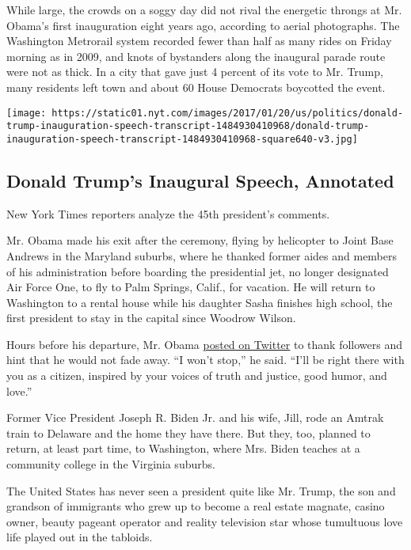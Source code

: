 While large, the crowds on a soggy day did not rival the energetic
throngs at Mr. Obama's first inauguration eight years ago, according to
aerial photographs. The Washington Metrorail system recorded fewer than
half as many rides on Friday morning as in 2009, and knots of bystanders
along the inaugural parade route were not as thick. In a city that gave
just 4 percent of its vote to Mr. Trump, many residents left town and
about 60 House Democrats boycotted the event.

\href{https://www.nytimes.com/interactive/2017/01/20/us/politics/donald-trump-inauguration-speech-transcript.html}{}

\texttt{[image: https://static01.nyt.com/images/2017/01/20/us/politics/donald-trump-inauguration-speech-transcript-1484930410968/donald-trump-inauguration-speech-transcript-1484930410968-square640-v3.jpg]}

\hypertarget{donald-trumps-inaugural-speech-annotated}{%
\subsection{Donald Trump's Inaugural Speech,
Annotated}\label{donald-trumps-inaugural-speech-annotated}}

New York Times reporters analyze the 45th president's comments.

Mr. Obama made his exit after the ceremony, flying by helicopter to
Joint Base Andrews in the Maryland suburbs, where he thanked former
aides and members of his administration before boarding the presidential
jet, no longer designated Air Force One, to fly to Palm Springs, Calif.,
for vacation. He will return to Washington to a rental house while his
daughter Sasha finishes high school, the first president to stay in the
capital since Woodrow Wilson.

Hours before his departure, Mr. Obama
\href{https://twitter.com/POTUS44/status/822446040729157632}{posted on
Twitter} to thank followers and hint that he would not fade away. ``I
won't stop,'' he said. ``I'll be right there with you as a citizen,
inspired by your voices of truth and justice, good humor, and love.''

Former Vice President Joseph R. Biden Jr. and his wife, Jill, rode an
Amtrak train to Delaware and the home they have there. But they, too,
planned to return, at least part time, to Washington, where Mrs. Biden
teaches at a community college in the Virginia suburbs.

The United States has never seen a president quite like Mr. Trump, the
son and grandson of immigrants who grew up to become a real estate
magnate, casino owner, beauty pageant operator and reality television
star whose tumultuous love life played out in the tabloids.

